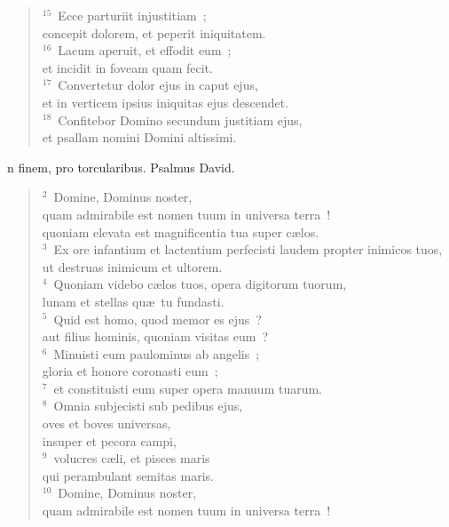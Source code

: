 \begin{flushleft}
\begin{verse}
${}^{15}$~Ecce parturiit injustitiam~;\\ concepit dolorem, et peperit iniquitatem.\\
${}^{16}$~Lacum aperuit, et effodit eum~;\\ et incidit in foveam quam fecit.\\
${}^{17}$~Convertetur dolor ejus in caput ejus,\\ et in verticem ipsius iniquitas ejus descendet.\\
${}^{18}$~Confitebor Domino secundum justitiam ejus,\\ et psallam nomini Domini altissimi.\end{verse}\end{flushleft}



\bchapter
{}n finem, pro torcularibus. Psalmus David.
\begin{flushleft}\begin{verse}\vspace{6pt}${}^{2}$~Domine, Dominus noster,\\ quam admirabile est nomen tuum in universa terra~!\\ quoniam elevata est magnificentia tua super c\ae los.\\
${}^{3}$~Ex ore infantium et lactentium perfecisti laudem propter inimicos tuos,\\ ut destruas inimicum et ultorem.\\
${}^{4}$~Quoniam videbo c\ae los tuos, opera digitorum tuorum,\\ lunam et stellas qu\ae\ tu fundasti.\\
${}^{5}$~Quid est homo, quod memor es ejus~?\\ aut filius hominis, quoniam visitas eum~?\\
${}^{6}$~Minuisti eum paulominus ab angelis~;\\ gloria et honore coronasti eum~;\\
${}^{7}$~et constituisti eum super opera manuum tuarum.\\
${}^{8}$~Omnia subjecisti sub pedibus ejus,\\ oves et boves universas,\\ insuper et pecora campi,\\
${}^{9}$~volucres c\ae li, et pisces maris\\ qui perambulant semitas maris.\\
${}^{10}$~Domine, Dominus noster,\\ quam admirabile est nomen tuum in universa terra~!\end{verse}\end{flushleft}



